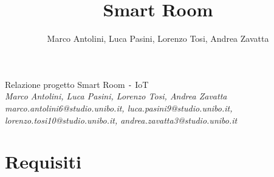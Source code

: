 \documentclass[12pt]{article}
\title{Smart Room}
\author{Marco Antolini, Luca Pasini, Lorenzo Tosi, Andrea Zavatta}
\def\code#1{\texttt{#1}}
\begin{document}
\begin{center}
    \vspace*{\fill}
    \Huge{Relazione progetto Smart Room \code{-} IoT} \\
    \vspace*{\fill}
    \Large\textsl{Marco Antolini, Luca Pasini, Lorenzo Tosi, Andrea Zavatta} \\
    \vskip 1cm
    \large\textsl{marco.antolini6@studio.unibo.it, luca.pasini9@studio.unibo.it, lorenzo.tosi10@studio.unibo.it, andrea.zavatta3@studio.unibo.it}
    \vspace*{\fill}
\end{center}

\newpage

\tableofcontents
\newpage


\section{Requisiti}
\end{document}
